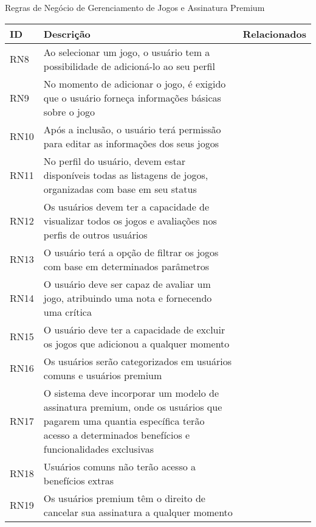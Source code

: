 \begin{quadro}[h!]
\centering
\caption{Regras de Negócio de Gerenciamento de Jogos e Assinatura Premium}
\label{tab:regrasdenegocio2}
\begin{longtable}{|p{2.5cm}|p{10.0cm}|p{2.5cm}|}
\hline
ID & Descrição & Relacionados
\\\hline
RN8 & Ao selecionar um jogo, o usuário tem a possibilidade de adicioná-lo ao seu perfil &  \
\\\hline
RN9 & No momento de adicionar o jogo, é exigido que o usuário forneça informações básicas sobre o jogo &  \
\\\hline
RN10 & Após a inclusão, o usuário terá permissão para editar as informações dos seus jogos &  \
\\\hline
RN11 & No perfil do usuário, devem estar disponíveis todas as listagens de jogos, organizadas com base em seu status &  \
\\\hline
RN12 & Os usuários devem ter a capacidade de visualizar todos os jogos e avaliações nos perfis de outros usuários &  \
\\\hline
RN13 & O usuário terá a opção de filtrar os jogos com base em determinados parâmetros &  \
\\\hline
RN14 & O usuário deve ser capaz de avaliar um jogo, atribuindo uma nota e fornecendo uma crítica &  \
\\\hline
RN15 & O usuário deve ter a capacidade de excluir os jogos que adicionou a qualquer momento &  \
\\\hline
RN16 & Os usuários serão categorizados em usuários comuns e usuários premium &  \
\\\hline
RN17 & O sistema deve incorporar um modelo de assinatura premium, onde os usuários que pagarem uma quantia específica terão acesso a determinados benefícios e funcionalidades exclusivas &  \
\\\hline
RN18 & Usuários comuns não terão acesso a benefícios extras &  \
\\\hline
RN19 & Os usuários premium têm o direito de cancelar sua assinatura a qualquer momento &  \
\\\hline
\end{longtable}
\end{quadro}


